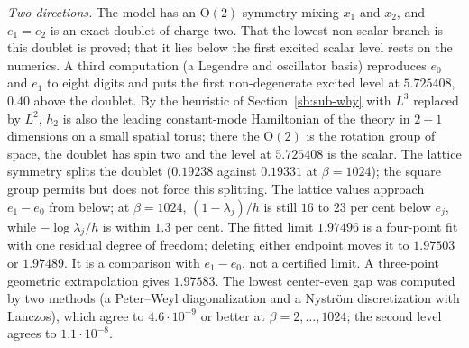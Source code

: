\emph{Two directions.} The model has an $\mathrm{O}(2)$ symmetry mixing $x_1$ and $x_2$, and $e_1=e_2$ is an
exact doublet of charge two. That the lowest non-scalar branch is this doublet is proved; that it lies
below the first excited scalar level rests on the numerics. A third computation (a Legendre and oscillator basis)
reproduces $e_0$ and $e_1$ to eight digits and puts the first non-degenerate excited level at $5.725408$, $0.40$
above the doublet. By the heuristic of Section~\ref{sb:sub-why} with $L^3$ replaced by $L^2$, $h_2$ is also the
leading constant-mode Hamiltonian of the theory in $2+1$ dimensions on a small spatial torus; there the
$\mathrm{O}(2)$ is the rotation group of space, the doublet has spin two and the level at $5.725408$ is the scalar. The lattice symmetry splits the doublet
($0.19238$ against $0.19331$ at $\beta=1024$); the square group permits but does not force this splitting.
The lattice values approach $e_1-e_0$ from below; at $\beta=1024$, $(1-\lambda_j)/h$ is still $16$ to
$23$ per cent below $e_j$, while $-\log\lambda_j/h$ is within $1.3$ per cent.
The fitted limit $1.97496$ is a four-point fit with one residual degree of freedom; deleting either endpoint
moves it to $1.97503$ or $1.97489$. It is a comparison with $e_1-e_0$, not a certified limit. A three-point
geometric extrapolation gives $1.97583$.
The lowest center-even gap was computed by two methods (a Peter--Weyl diagonalization and a Nystr\"om
discretization with Lanczos), which agree to $4.6\cdot10^{-9}$ or better at $\beta=2,\dots,1024$; the second
level agrees to $1.1\cdot10^{-8}$.

